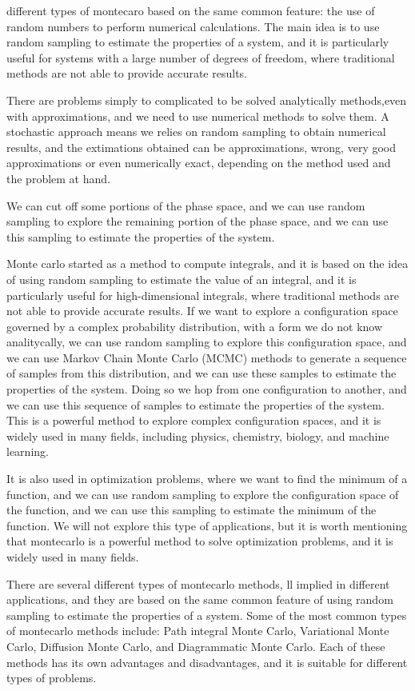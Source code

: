 different types of montecaro based on the same common feature: the use of random numbers to perform numerical calculations. The main idea is to use random sampling to estimate the properties of a system, and it is particularly useful for systems with a large number of degrees of freedom, where traditional methods are not able to provide accurate results.

There are problems simply to complicated to be solved analytically methods,even with approximations, and we need to use numerical methods to solve them. A stochastic approach means we relies on random sampling to obtain numerical results, and the extimations obtained can be approximations, wrong, very good approximations or even numerically exact, depending on the method used and the problem at hand.

We can cut off some portions of the phase space, and we can use random sampling to explore the remaining portion of the phase space, and we can use this sampling to estimate the properties of the system.

Monte carlo started as a method to compute integrals, and it is based on the idea of using random sampling to estimate the value of an integral, and it is particularly useful for high-dimensional integrals, where traditional methods are not able to provide accurate results.
If we want to explore a configuration space governed by a complex probability distribution, with a form we do not know analitycally, we can use random sampling to explore this configuration space, and we can use Markov Chain Monte Carlo (MCMC) methods to generate a sequence of samples from this distribution, and we can use these samples to estimate the properties of the system. Doing so we hop from one configuration to another, and we can use this sequence of samples to estimate the properties of the system. This is a powerful method to explore complex configuration spaces, and it is widely used in many fields, including physics, chemistry, biology, and machine learning.

It is also used in optimization problems, where we want to find the minimum of a function, and we can use random sampling to explore the configuration space of the function, and we can use this sampling to estimate the minimum of the function. We will not explore this type of applications, but it is worth mentioning that montecarlo is a powerful method to solve optimization problems, and it is widely used in many fields.

There are several different types of montecarlo methods, ll implied in different applications, and they are based on the same common feature of using random sampling to estimate the properties of a system. Some of the most common types of montecarlo methods include: Path integral Monte Carlo, Variational Monte Carlo, Diffusion Monte Carlo, and Diagrammatic Monte Carlo. Each of these methods has its own advantages and disadvantages, and it is suitable for different types of problems.

